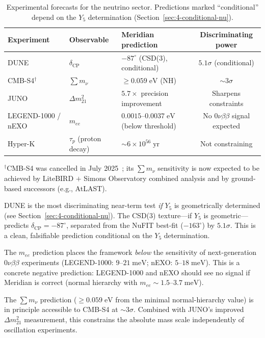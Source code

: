 \begin{table}[htbp]
\centering
\caption{Experimental forecasts for the neutrino sector.  Predictions marked ``conditional'' depend on the $Y_5$ determination (Section~\ref{sec:4-conditional-nu}).}
\label{tab:4-experiment-forecast}
\small
\begin{tabular}{@{}lllc@{}}
\toprule
Experiment & Observable & Meridian prediction & Discriminating power \\
\midrule
DUNE & $\delta_{\mathrm{CP}}$ & $-87^\circ$ (CSD(3), conditional) & $5.1\sigma$ (conditional) \\
CMB-S4$^\dagger$ & $\sum m_\nu$ & $\geq 0.059\;\mathrm{eV}$ (NH) & $\sim 3\sigma$ \\
JUNO & $\Delta m^2_{21}$ & $5.7\times$ precision improvement & Sharpens constraints \\
LEGEND-1000 / nEXO & $m_{ee}$ & $0.0015$--$0.0037\;\mathrm{eV}$ (below threshold) & No $0\nu\beta\beta$ signal expected \\
Hyper-K & $\tau_p$ (proton decay) & $\sim 6 \times 10^{56}\;\mathrm{yr}$ & Not constraining \\
\bottomrule
\end{tabular}

\smallskip\noindent$^\dagger$CMB-S4 was cancelled in July 2025~\cite{ch4:CMBS4}; its $\sum m_\nu$ sensitivity is now expected to be achieved by LiteBIRD $+$ Simons Observatory combined analysis and by ground-based successors (e.g., AtLAST).
\end{table}

DUNE is the most discriminating near-term test \emph{if} $Y_5$ is geometrically determined (see Section~\ref{sec:4-conditional-nu}).  The CSD(3) texture---if $Y_5$ is geometric---predicts $\delta_{\mathrm{CP}} = -87^\circ$, separated from the NuFIT best-fit ($-163^\circ$) by $5.1\sigma$.  This is a clean, falsifiable prediction conditional on the $Y_5$ determination.

The $m_{ee}$ prediction places the framework \emph{below} the sensitivity of next-generation $0\nu\beta\beta$ experiments (LEGEND-1000: $9$--$21\;\mathrm{meV}$; nEXO: $5$--$18\;\mathrm{meV}$).  This is a concrete negative prediction: LEGEND-1000 and nEXO should see no signal if Meridian is correct (normal hierarchy with $m_{ee} \sim 1.5$--$3.7\;\mathrm{meV}$).

The $\sum m_\nu$ prediction ($\geq 0.059\;\mathrm{eV}$ from the minimal normal-hierarchy value) is in principle accessible to CMB-S4 at $\sim 3\sigma$.  Combined with JUNO's improved $\Delta m^2_{21}$ measurement, this constrains the absolute mass scale independently of oscillation experiments.

